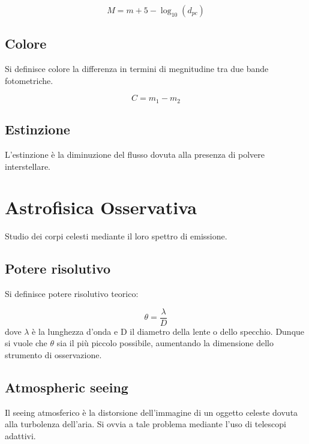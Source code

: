 \documentclass{article}
\begin{document}
\begin{equation}
    M = m + 5 -\log_{10}(d_{pc})
\end{equation}


\subsection{Colore}
Si definisce colore la differenza in termini di megnitudine tra due bande fotometriche.

\begin{equation}
    C = m_1 - m_2
\end{equation}

\subsection{Estinzione}
L'estinzione è la diminuzione del flusso dovuta alla presenza di polvere interstellare.



\section{Astrofisica Osservativa}
Studio dei corpi celesti mediante il loro spettro di emissione.

\subsection{Potere risolutivo}
Si definisce potere risolutivo teorico:

\begin{equation}
    \theta = \frac{\lambda}{D}
\end{equation}
dove $\lambda$ è la lunghezza d'onda e D il diametro della lente o dello specchio.
Dunque si vuole che $\theta$ sia il più piccolo possibile, aumentando la dimensione dello strumento di osservazione.

\subsection{Atmospheric seeing}
Il seeing atmosferico è la distorsione dell'immagine di un oggetto celeste dovuta alla turbolenza dell'aria.
Si ovvia a tale problema mediante l'uso di telescopi adattivi.
\end{document}

